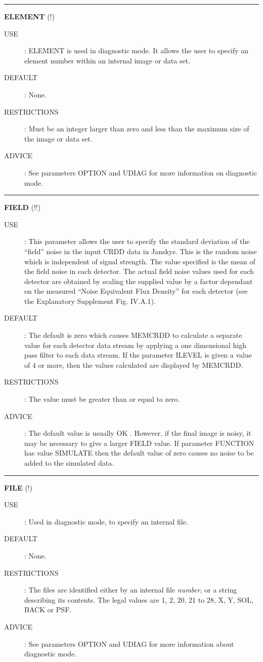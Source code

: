 \rule{\textwidth}{0.3mm}
{\Large {\bf ELEMENT} (!)}
\begin{description}
\item [USE]:
ELEMENT is used in diagnostic mode. It allows the user to specify an element 
number within an internal image or data set.
\item [DEFAULT]:
None.
\item [RESTRICTIONS]:
Must be an integer larger than zero and less than the maximum size of the image
or data set.
\item [ADVICE]:
See parameters OPTION and UDIAG for more information on diagnostic mode.
\end {description}

\rule{\textwidth}{0.3mm}
{\Large {\bf FIELD} (!!)}
\begin{description}
\item [USE]:
This parameter allows the user to specify the standard deviation of the
``field'' noise in the input CRDD data in Janskys. This is the random noise
which is independent of signal strength. The value specified is the mean of the
field noise in each detector. The actual field noise values used for each
detector are obtained by scaling the supplied value by a factor dependant on the
measured ``Noise Equivalent Flux Density'' for each detector (see the
Explanatory Supplement Fig. IV.A.1). 
\item [DEFAULT]:
The default is zero which causes MEMCRDD to calculate a separate value
for each detector data stream by applying a one dimensional high pass filter
to each data stream. If the parameter ILEVEL is given a value of 4 or more, then
the values calculated are displayed by MEMCRDD.
\item [RESTRICTIONS]:
The value must be greater than or equal to zero.
\item [ADVICE]:
The default value is usually OK . However, if the final image is noisy, it may
be necessary to give a larger FIELD value. If parameter FUNCTION has value 
SIMULATE then the default value of zero causes no noise to be added to the 
simulated data.
\end {description}

\rule{\textwidth}{0.3mm}
{\Large {\bf FILE} (!)}
\begin{description}
\item [USE]:
Used in diagnostic mode, to specify an internal file.
\item [DEFAULT]:
None.
\item [RESTRICTIONS]:
The files are identified either by an internal file {\em number}, or a string
describing its contents. The legal values are 1, 2, 20, 21 to 28, X, Y, SOL,
BACK or PSF.
\item [ADVICE]:
See parameters OPTION and UDIAG for more information about diagnostic mode.
\end {description}

